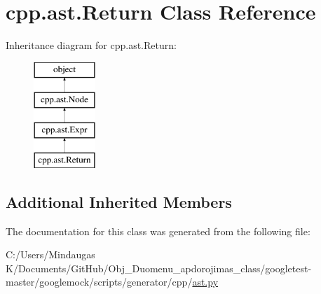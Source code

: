 \hypertarget{classcpp_1_1ast_1_1_return}{}\section{cpp.\+ast.\+Return Class Reference}
\label{classcpp_1_1ast_1_1_return}
Inheritance diagram for cpp.\+ast.\+Return\+:\begin{figure}[H]
\begin{center}
\leavevmode
\includegraphics[height=4.000000cm]{d0/d95/classcpp_1_1ast_1_1_return}
\end{center}
\end{figure}
\subsection*{Additional Inherited Members}


The documentation for this class was generated from the following file\+:\begin{DoxyCompactItemize}
\item 
C\+:/\+Users/\+Mindaugas K/\+Documents/\+Git\+Hub/\+Obj\+\_\+\+Duomenu\+\_\+apdorojimas\+\_\+class/googletest-\/master/googlemock/scripts/generator/cpp/\mbox{\hyperlink{googletest-master_2googlemock_2scripts_2generator_2cpp_2ast_8py}{ast.\+py}}\end{DoxyCompactItemize}
